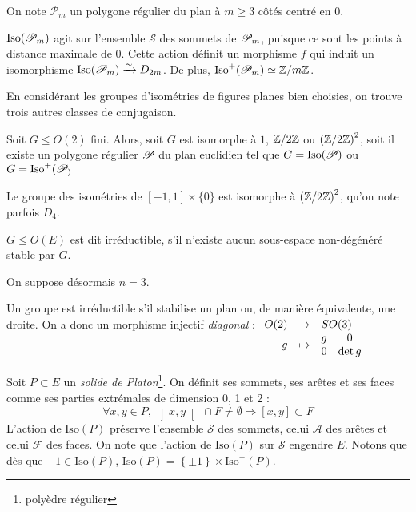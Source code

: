 \documentclass{cours}
\begin{document}
\begin{definition}
    On note $\mathscr{P}_{m}$ un polygone régulier du plan à $m \geq 3$ côtés centré en $0$.
\end{definition}

\begin{proposition}
    $\text{Iso}(\mathscr{P}_{m})$ agit sur l'ensemble $\mathscr{S}$ des sommets de $\mathscr{P}_{m}$, puisque ce sont les points à distance maximale de $0$. Cette action définit un morphisme $f$ qui induit un isomorphisme $\text{Iso}(\mathscr{P}_{m}) \xrightarrow{\sim} D_{2m}$. De plus, $\text{Iso}^{+}(\mathscr{P}_{m}) \simeq \mathbb{Z}/m\mathbb{Z}$.
\end{proposition}

En considérant les groupes d'isométries de figures planes bien choisies, on trouve trois autres classes de conjugaison.

\begin{proposition}
    Soit $G \leq O(2)$ fini. Alors, soit $G$ est isomorphe à $1$, $\mathbb{Z}/2\mathbb{Z}$ ou $\left(\mathbb{Z}/2\mathbb{Z}\right)^{2}$, soit il existe un polygone régulier $\mathscr{P}_{}$ du plan euclidien tel que $G = \text{Iso}(\mathscr{P}_{})$ ou $G = \text{Iso}^{+}(\mathscr{P}_{)}$
\end{proposition}
\begin{remark}
    Le groupe des isométries de $\left[-1, 1\right] \times \{0\}$ est isomorphe à $\left(\mathbb{Z}/2\mathbb{Z}\right)^{2}$, qu'on note parfois $D_{4}$.
\end{remark}

\begin{definition}
    $G \leq O(E)$ est dit irréductible, s'il n'existe aucun sous-espace non-dégénéré stable par $G$.
\end{definition}

On suppose désormais $n = 3$. 

\begin{remark}
    Un groupe est irréductible s'il stabilise un plan ou, de manière équivalente, une droite. On a donc un morphisme injectif \emph{diagonal} :
    $\begin{array}[t]{rcl} O(2) & \to & SO(3) \\ g & \mapsto & \begin{matrix}g & 0\\ 0 & \det g\end{matrix} \end{array}$
\end{remark}

\begin{definition}
    Soit $P \subset E$ un \emph{solide de Platon}\footnote{polyèdre régulier}. On définit ses sommets, ses arêtes et ses faces comme ses parties extrémales de dimension 0, 1 et 2 : 
    \[
        \forall x, y \in P, \ \left]x, y \right[\ \cap F \neq \emptyset \Rightarrow \left[x, y\right]\subset F
    \]
    L'action de $\text{Iso}(P)$ préserve l'ensemble $\mathscr{S}$ des sommets, celui $\mathscr{A}$ des arêtes et celui $\mathscr{F}$ des faces. On note que l'action de $\text{Iso}(P)$ sur $\mathscr{S}$ engendre $E$. Notons que dès que $-1 \in \text{Iso}(P)$, $\text{Iso}(P) = \left\{\pm 1\right\} \times \text{Iso}^{+}(P)$.
\end{definition}
\end{document}
